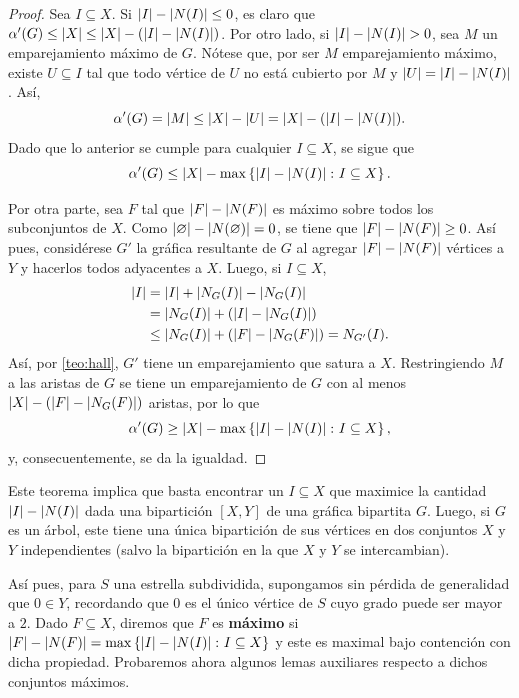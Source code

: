 \begin{proof}
    Sea $I\subseteq X$. Si $\left|I\right|-\left|N(I)\right|\leq 0$, es claro que $\alpha'(G)
    \leq \left|X\right| \leq \left|X\right| - (\left|I\right| - \left|N(I)\right|)$. Por otro lado, si
    $\left|I\right| - \left|N(I)\right| > 0$, sea $M$ un emparejamiento m\'aximo de $G$.
    N\'otese que, por ser $M$ emparejamiento m\'aximo, existe $U\subseteq I$ tal
    que todo v\'ertice de $U$ no est\'a cubierto por $M$ y $\left|U\right| = \left|I\right| -
    \left|N(I)\right|$. As\'i, 
    \[
        \alpha'(G) = \left|M\right| \leq \left|X\right| - \left|U\right| = \left|X\right| - (\left|I\right| -
        \left|N(I)\right|).
    \]
    Dado que lo anterior se cumple para cualquier $I\subseteq X$, se sigue que
    \[
        \alpha'(G) \leq \left|X\right| - \max\left\{ \left|I\right| - \left|N(I)\right| \colon I\subseteq X\right\}.
    \]

    Por otra parte, sea $F$ tal que $\left|F\right| - \left|N(F)\right|$ es m\'aximo sobre
    todos los subconjuntos de $X$. Como $\left|\varnothing\right| -
    \left|N(\varnothing)\right|=0$, se tiene que $\left|F\right| - \left|N(F)\right|\geq 0$. As\'i
    pues, consid\'erese $G'$ la gr\'afica resultante de $G$ al agregar $\left|F\right|
    - \left|N(F)\right|$ v\'ertices a $Y$ y hacerlos todos adyacentes a $X$. Luego, si
    $I\subseteq X$,
    \begin{align*}
        \left|I\right| &= \left|I\right| + \left|N_G(I)\right| - \left|N_G(I)\right| \\
                &= \left|N_G(I)\right| + (\left|I\right| - \left|N_G(I)\right|) \\
                &\leq \left|N_G(I)\right| + (\left|F\right| - \left|N_G(F)\right|) = N_{G'}(I).
    \end{align*}
    As\'i, por \cref{teo:hall}, $G'$ tiene un emparejamiento que satura a
    $X$. Restringiendo $M$ a las aristas de $G$ se tiene un emparejamiento de
    $G$ con al menos $\left|X\right| - (\left|F\right| - \left|N_G(F)\right|)$ aristas, por lo que
    \[
        \alpha'(G) \geq \left|X\right| - \max\left\{ \left|I\right| - \left|N(I)\right| \colon I\subseteq X\right\},
    \]
    y, consecuentemente, se da la igualdad.

\end{proof}

Este teorema implica que basta encontrar un $I\subseteq X$ que maximice la
cantidad $\left|I\right| - \left|N(I)\right|$ dada una bipartici\'on $[X,Y]$ de una gr\'afica
bipartita $G$. Luego, si $G$ es un \'arbol, este tiene una \'unica bipartici\'on
de sus v\'ertices en dos conjuntos $X$ y $Y$ independientes (salvo la
bipartici\'on en la que $X$ y $Y$ se intercambian).

As\'i pues, para $S$ una estrella subdividida, supongamos sin p\'erdida de
generalidad que $0\in Y$, recordando que $0$ es el \'unico v\'ertice de $S$ cuyo
grado puede ser mayor a $2$. Dado $F\subseteq X$, diremos que $F$ es
\textbf{m\'aximo} si $\left|F\right|-\left|N(F)\right| = \max\left\{ \left|I\right| - \left|N(I)\right| \colon
I\subseteq X\right\}$ y este es maximal bajo contenci\'on con dicha propiedad.
Probaremos ahora algunos lemas auxiliares respecto a dichos conjuntos m\'aximos.

